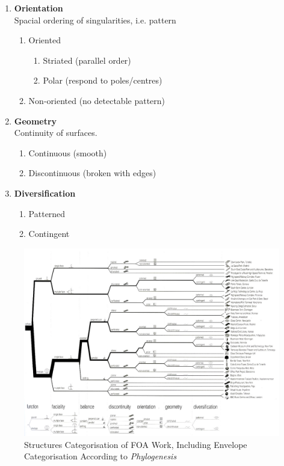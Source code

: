 \begin{multicols}{2}
\begin{enumerate}
	\item \textbf{Orientation}\\
		Spacial ordering of singularities, i.e. pattern
		\begin{enumerate}
			\item Oriented
				\begin{enumerate}
					\item Striated (parallel order)
					\item Polar (respond to poles/centres)
				\end{enumerate}
			\item Non-oriented (no detectable pattern)
		\end{enumerate}
	\item \textbf{Geometry}\\
		Continuity of surfaces.
		\begin{enumerate}
			\item Continuous (smooth)
			\item Discontinuous (broken with edges)
		\end{enumerate}
	\item \textbf{Diversification}
		\begin{enumerate}
			\item Patterned
			\item Contingent
		\end{enumerate}
\end{enumerate}
\end{multicols}

\begin{figure}
	\centering
	\includegraphics[width=0.95\textheight]{./Images/1-Phylogenesis}
	\caption[FOA Phylogenesis]{Structures Categorisation of FOA Work, Including Envelope Categorisation According to \emph{Phylogenesis} \cite{foa04}}
	\label{fig:Phylogenesis}
\end{figure}

